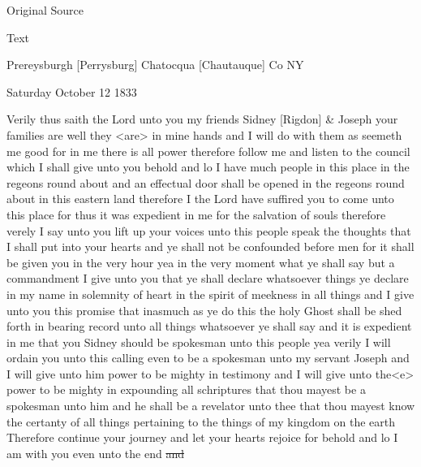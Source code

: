 			
			\begin{description}
				\item[Original Source]
			\end{description}
			
			
			\begin{description}
				\item[Text]
			\end{description}
			
				\begin{tightcenter}
				Prereysburgh [Perrysburg] Chatocqua [Chautauque] Co NY
				\end{tightcenter}
				
				Saturday October 12 1833
				
				Verily thus saith the Lord unto you my friends Sidney [Rigdon] \& Joseph your families are well they <are> in mine hands and I will do with them as seemeth me good for in me there is all power therefore follow me and listen to the council which I shall give unto you behold and lo I have much people in this place in the regeons round about and an effectual door shall be opened in the regeons round about in this eastern land therefore I the Lord have suffired you to come unto this place for thus it was expedient in me for the salvation of souls therefore verely I say unto you lift up your voices unto this people speak the thoughts that I shall put into your hearts and ye shall not be confounded before men for it shall be given you in the very hour yea in the very moment what ye shall say but a commandment I give unto you that ye shall declare whatsoever things ye declare in my name in solemnity of heart in the spirit of meekness in all things and I give unto you this promise that inasmuch as ye do this the holy Ghost shall be shed forth in bearing record unto all things whatsoever ye shall say and it is expedient in me that you Sidney should be spokesman unto this people yea verily I will ordain you unto this calling even to be a spokesman unto my servant Joseph and I will give unto him power to be mighty in testimony and I will give unto the<e> power to be mighty in expounding all schriptures that thou mayest be a spokesman unto him and he shall be a revelator unto thee that thou mayest know the certanty of all things pertaining to the things of my kingdom on the earth Therefore continue your journey and let your hearts rejoice for behold and lo I am with you even unto the end \sout{and}
				

